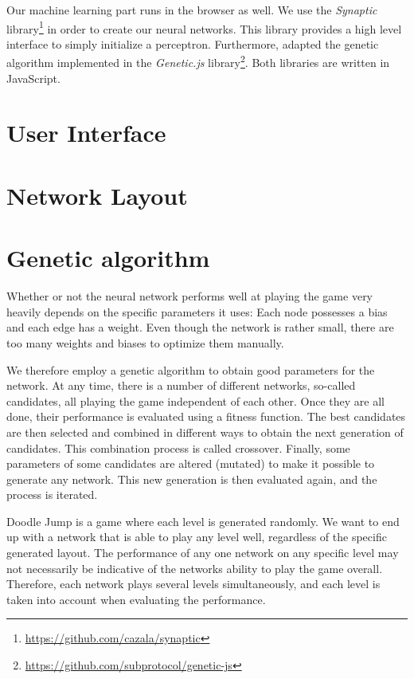 \documentclass[a4paper,12pt,pagesize,headsepline,bibtotoc,titlepage,abstracton]{scrartcl}
\begin{document}
Our machine learning part runs in the browser as well. We use the \textit{Synaptic} library\footnote{\url{https://github.com/cazala/synaptic}} in order to create our neural networks. This library provides a high level interface to simply initialize a perceptron. Furthermore, adapted the genetic algorithm implemented in the \textit{Genetic.js} library\footnote{\url{https://github.com/subprotocol/genetic-js}}. Both libraries are written in JavaScript.


\section{User Interface}

\section{Network Layout}

\section{Genetic algorithm}
\label{sec:ga}

Whether or not the neural network performs well at playing the game very heavily depends on the specific parameters it uses: Each node possesses a bias and each edge has a weight. Even though the network is rather small, there are too many weights and biases to optimize them manually. 

We therefore employ a genetic algorithm to obtain good parameters for the network. At any time, there is a number of different networks, so-called candidates, all playing the game independent of each other. Once they are all done, their performance is evaluated using a fitness function. The best candidates are then selected and combined in different ways to obtain the next generation of candidates. This combination process is called crossover. Finally, some parameters of some candidates are altered (mutated) to make it possible to generate any network. This new generation is then evaluated again, and the process is iterated.

Doodle Jump is a game where each level is generated randomly. We want to end up with a network that is able to play any level well, regardless of the specific generated layout. The performance of any one network on any specific level may not necessarily be indicative of the networks ability to play the game overall. Therefore, each network plays several levels simultaneously, and each level is taken into account when evaluating the performance.
\end{document}
